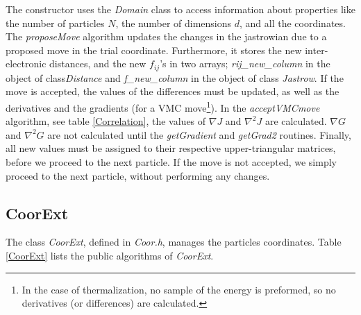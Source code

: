 The constructor uses the \emph{Domain} class to access information
about properties like the number of particles $N$, the number of
dimensions $d$, and all the coordinates. The \emph{proposeMove}
algorithm updates the changes in the jastrowian due to a proposed move
in the trial coordinate. Furthermore, it stores the
new inter-electronic distances, and the new $f_{ij}$'s in two arrays;
\emph{rij\_new\_column} in the object of class\emph{Distance} and
\emph{f\_new\_column} in the object of class \emph{Jastrow}. \newline 
If the move is accepted, the values of the differences must be
updated, as well as the derivatives and the gradients (for a VMC
move\footnote{In the case of thermalization, no
  sample of the energy is preformed, so no derivatives (or
  differences) are calculated.}). 
In the \emph{acceptVMCmove} algorithm, see table \ref{Correlation}, the
values of $\nabla J$ and $\nabla^2 J$ are calculated. $\nabla G$
and $\nabla^2 G$ are not calculated until the \emph{getGradient} and
\emph{getGrad2} routines.
Finally, all new values must be assigned to their respective
upper-triangular matrices, before we proceed to the next particle. 
\newline
If the move is not accepted, we simply proceed to the next particle,
without performing any changes.



\subsection{CoorExt}

The class \emph{CoorExt}, defined in \emph{Coor.h}, manages the
particles coordinates. Table 
\ref{CoorExt} lists the public algorithms of \emph{CoorExt}. 

